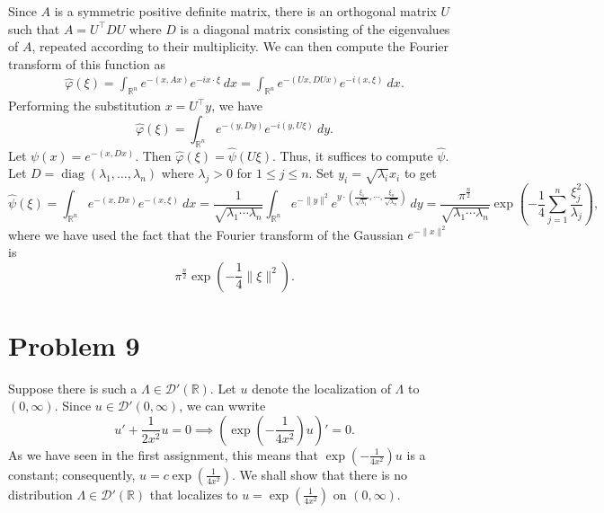 \documentclass[10pt]{amsart}
\theoremstyle{thmstyle}
\theoremstyle{defstyle}
\newcommand{\R}{\mathbb{R}}
\newcommand{\wh}[1]{\widehat{#1}}
\renewcommand{\le}{\leqslant}
\begin{document}
Since $A$ is a symmetric positive definite matrix, there is an orthogonal matrix $U$ such that $A = U^\top D U$ where $D$ is a diagonal matrix consisting of the eigenvalues of $A$, repeated according to their multiplicity. We can then compute the Fourier transform of this function as 
\begin{align*}
    \wh\varphi(\xi) = \int_{\R^n} e^{-(x, Ax)}e^{-ix\cdot\xi}~dx = \int_{\R^n} e^{-(Ux, DUx)}e^{-i(x,\xi)}~dx.
\end{align*}
Performing the substitution $x = U^\top y$, we have 
\begin{equation*}
    \wh\varphi(\xi) = \int_{\R^n} e^{-(y, Dy)} e^{-i(y, U\xi)}~dy.
\end{equation*}
Let $\psi(x) = e^{-(x, Dx)}$. Then $\wh\varphi(\xi) = \wh\psi(U\xi)$. Thus, it suffices to compute $\wh\psi$. Let $D = \operatorname{diag}(\lambda_1,\dots,\lambda_n)$ where $\lambda_j > 0$ for $1\le j\le n$. Set $y_i = \sqrt{\lambda_i}x_i$ to get 
\begin{equation*}
    \wh\psi(\xi) = \int_{\R^n} e^{-(x, Dx)}e^{-(x, \xi)}~dx = \frac{1}{\sqrt{\lambda_1\cdots\lambda_n}}\int_{\R^n} e^{-\|y\|^2} e^{y\cdot\left(\frac{\xi_1}{\sqrt{\lambda_1}},\cdots,\frac{\xi_n}{\sqrt{\lambda_n}}\right)}~dy = \frac{\pi^{\frac{n}{2}}}{\sqrt{\lambda_1\cdots\lambda_n}}\exp\left(-\frac{1}{4}\sum_{j = 1}^n\frac{\xi_j^2}{\lambda_j}\right),
\end{equation*}
where we have used the fact that the Fourier transform of the Gaussian $e^{-\|x\|^2}$ is 
\begin{equation*}
    \pi^{\frac{n}{2}}\exp\left(-\frac{1}{4}\|\xi\|^2\right).
\end{equation*}

\section{Problem 9}

Suppose there is such a $\Lambda\in\mathscr D'(\R)$. Let $u$ denote the localization of $\Lambda$ to $(0,\infty)$. Since $u\in\mathscr D'(0,\infty)$, we can wwrite 
\begin{equation*}
    u' + \frac{1}{2x^2}u = 0\implies \left(\exp\left(-\frac{1}{4x^2}\right)u\right)' = 0.
\end{equation*}
As we have seen in the first assignment, this means that $\exp\left(-\frac{1}{4x^2}\right)u$ is a constant; consequently, $u = c\exp\left(\frac{1}{4x^2}\right)$. We shall show that there is no distribution $\Lambda\in\mathscr D'(\R)$ that localizes to $u = \exp\left(\frac{1}{4x^2}\right)$ on $(0, \infty)$.
\end{document}
